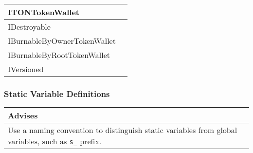 \noindent\begin{tabular}{|l|p{5cm}|}\hline
ITONTokenWallet & \\\hline
IDestroyable & \\\hline
IBurnableByOwnerTokenWallet & \\\hline
IBurnableByRootTokenWallet & \\\hline
IVersioned & \\\hline
\end{tabular}


\subsubsection{Static Variable Definitions}


\ifsoldraft
\noindent\begin{tabular}{|p{12cm}|}\hline
\rowcolor{green}Advises
\\\hline
Use a naming convention to distinguish static variables from global variables, such as \verb+s_+ prefix.
\\\hline\end{tabular}
\fi

